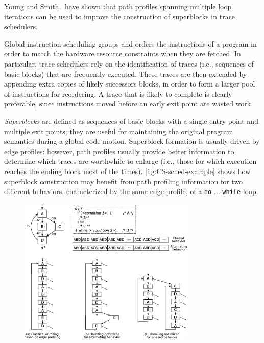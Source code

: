 Young and Smith~\cite{Young98} have shown that path profiles spanning multiple loop iterations can be used to improve the construction of superblocks in trace schedulers.

Global instruction scheduling groups and orders the instructions of a program in order to match the hardware resource constraints when they are fetched. In particular, trace schedulers rely on the identification of traces (i.e., sequences of basic blocks) that are frequently executed. These traces are then extended by appending extra copies of likely successors blocks, in order to form a larger pool of instructions for reordering. A trace that is likely to complete is clearly preferable, since instructions moved before an early exit point are wasted work.

{\em Superblocks} are defined as sequences of basic blocks with a single entry point and multiple exit points; they are useful for maintaining the original program semantics during a global code motion. Superblock formation is usually driven by edge profiles: however, path profiles usually provide better information to determine which traces are worthwhile to enlarge (i.e., those for which execution reaches the ending block most of the times). \myfigure\ref{fig:CS-sched-example} shows how superblock construction may benefit from path profiling information for two different behaviors, characterized by the same edge profile, of a {\tt do} $\ldots$ {\tt while} loop.

\ifdefined\noauthorea
\begin{figure}[!ht]
\begin{center}
\includegraphics[width=0.75\textwidth]{figures/CS-sched-example/CS-sched-example.eps}
\caption{\protect}
\end{center}
\end{figure}
\fi

